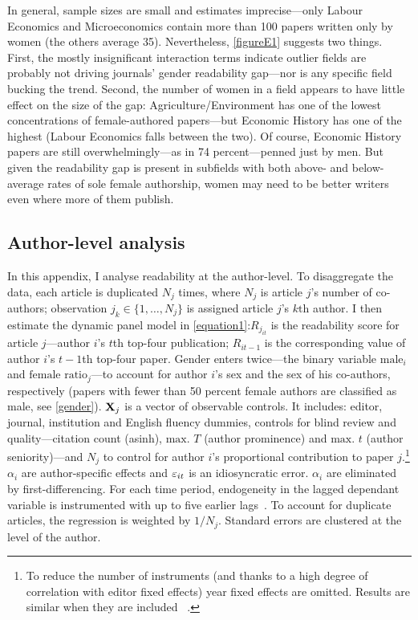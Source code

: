 \begin{appendices}
\begin{refsection}
In general, sample sizes are small and estimates imprecise---only Labour Economics and Microeconomics contain more than 100 papers written only by women (the others average 35). Nevertheless, \autoref{figureE1} suggests two things. First, the mostly insignificant interaction terms indicate outlier fields are probably not driving journals' gender readability gap---nor is any specific field bucking the trend. Second, the number of women in a field appears to have little effect on the size of the gap: Agriculture\slash Environment has one of the lowest concentrations of female-authored papers---but Economic History has one of the highest (Labour Economics falls between the two). Of course, Economic History papers are still overwhelmingly---as in 74 percent---penned just by men. But given the readability gap is present in subfields with both above- and below-average rates of sole female authorship, women may need to be better writers even where more of them publish.

\clearpage

\subsection{Author-level analysis}
\label{appendixauthorlevel}

In this appendix, I analyse readability at the author-level. To disaggregate the data, each article is duplicated $N_j$ times, where $N_j$ is article $j$'s number of co-authors; observation $j_k\in\{1,\ldots,N_j\}$ is assigned article $j$'s $k\text{th}$ author. I then estimate the dynamic panel model in \autoref{equation1}:$R_{j_{it}}$ is the readability score for article $j$---author $i$'s $t$th top-four publication; $R_{it-1}$ is the corresponding value of author $i$'s $t-1$th top-four paper. Gender enters twice---the binary variable $\text{male}_i$ and $\text{female ratio}_j$---to account for author $i$'s sex and the sex of his co-authors, respectively (papers with fewer than 50 percent female authors are classified as male, see \autoref{gender}). $\mathbf{X}_j$ is a vector of observable controls. It includes: editor, journal, institution and English fluency dummies, controls for blind review and quality---citation count (asinh), $\text{max. }T$ (author prominence) and $\text{max. }t$ (author seniority)---and $N_j$ to control for author $i$'s proportional contribution to paper $j$.\footnote{To reduce the number of instruments (and thanks to a high degree of correlation with editor fixed effects) year fixed effects are omitted. Results are similar when they are included ~\citep[see, \emph{e.g.},][p. 17]{Hengel2017}.} $\alpha_i$ are author-specific effects and $\varepsilon_{it}$ is an idiosyncratic error. $\alpha_i$ are eliminated by first-differencing. For each time period, endogeneity in the lagged dependant variable is instrumented with up to five earlier lags~\citep{Arellano1995,Blundell1998}. To account for duplicate articles, the regression is weighted by $1/N_j$. Standard errors are clustered at the level of the author.


\end{refsection}
\end{appendices}
